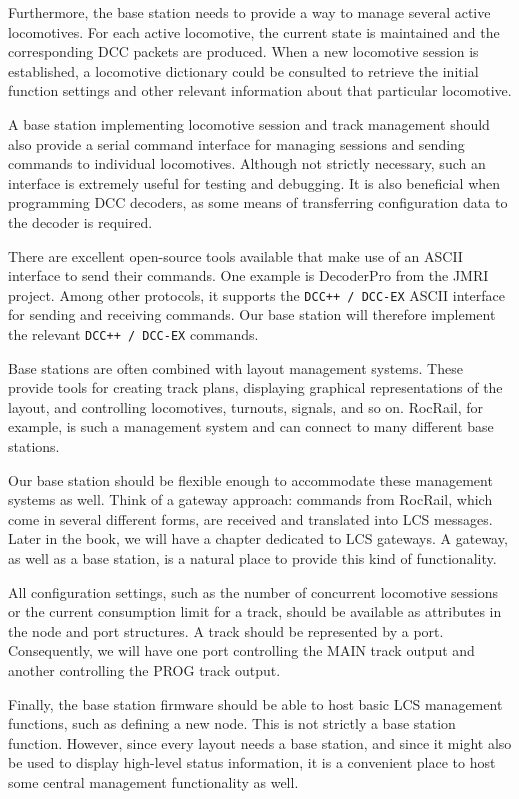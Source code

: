 Furthermore, the base station needs to provide a way to manage several active locomotives. 
For each active locomotive, the current state is maintained and the corresponding DCC packets 
are produced. When a new locomotive session is established, a locomotive dictionary could be 
consulted to retrieve the initial function settings and other relevant information about that 
particular locomotive.

A base station implementing locomotive session and track management should also provide a serial 
command interface for managing sessions and sending commands to individual locomotives. Although 
not strictly necessary, such an interface is extremely useful for testing and debugging. It is 
also beneficial when programming DCC decoders, as some means of transferring configuration data
 to the decoder is required.

There are excellent open-source tools available that make use of an ASCII interface to send their
 commands. One example is DecoderPro from the JMRI project. Among other protocols, it supports 
 the \texttt{DCC++ / DCC-EX} ASCII interface for sending and receiving commands. Our base 
 station will therefore implement the relevant \texttt{DCC++ / DCC-EX} commands.

Base stations are often combined with layout management systems. These provide tools for 
creating track plans, displaying graphical representations of the layout, and controlling 
locomotives, turnouts, signals, and so on. RocRail, for example, is such a management system 
and can connect to many different base stations.

Our base station should be flexible enough to accommodate these management systems as well. 
Think of a gateway approach: commands from RocRail, which come in several different forms, 
are received and translated into LCS messages. Later in the book, we will have a chapter 
dedicated to LCS gateways. A gateway, as well as a base station, is a natural place to provide
 this kind of functionality.

All configuration settings, such as the number of concurrent locomotive sessions or the current
 consumption limit for a track, should be available as attributes in the node and port structures.
  A track should be represented by a port. Consequently, we will have one port controlling the 
  MAIN track output and another controlling the PROG track output.

Finally, the base station firmware should be able to host basic LCS management functions, 
such as defining a new node. This is not strictly a base station function. However, since 
every layout needs a base station, and since it might also be used to display high-level status 
information, it is a convenient place to host some central management functionality as well.

